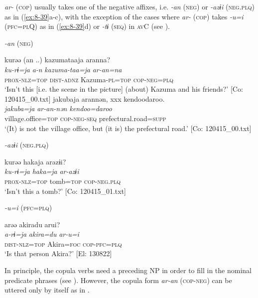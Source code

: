 \textit{ar-} (\textsc{cop}) usually takes one of the negative affixes, i.e. \textit{-an} (\textsc{neg}) or \textit{-azɨi} (\textsc{neg}.\textsc{plq}) as in (\ref{ex:8-39}a-c), with the exception of the cases where \textit{ar-} (\textsc{cop}) takes \textit{-u=i} (\textsc{pfc}=\textsc{pl}Q) as in (\ref{ex:8-39}d) or \textit{-tɨ} (\textsc{seq}) in \textsc{av}C (see ).

\ea\label{ex:8-39}
  \textit{-an} (\textsc{neg})

\ea
{\TM}
\glll  kurəə  (an ..)  kazumataaja  aranna?\\
\textit{ku-rɨ=ja}  \textit{a-n}  \textit{kazuma-taa=ja}  \textit{ar-an=na}\\
\textsc{prox}-\textsc{nlz}=\textsc{top}  \textsc{dist}-\textsc{adnz}  Kazuma-\textsc{pl}=\textsc{top}  \textsc{cop}-\textsc{neg}=\textsc{plq}\\
\glt ‘Isn’t this [i.e. the scene in the picture] (about) Kazuma and his friends?’ [Co: 120415\_00.txt]
\ex
{\TM}
\glll  jakubaja  arannən,  xxx  {\textbar}kendoo{\textbar}daroo.\\
\textit{jakuba=ja}  \textit{ar-an-nən    kendoo=daroo}\\
village.office=\textsc{top}  \textsc{cop}-\textsc{neg}-\textsc{seq}    prefectural.road=\textsc{supp}\\
\glt ‘(It) is not the village office, but (it is) the prefectural road.’ [Co: 120415\_00.txt]

  \textit{-azɨi} (\textsc{neg}.\textsc{plq})

\ex
{\TM}
\glll  kurəə  hakaja  arazɨi?\\
\textit{ku-rɨ=ja}  \textit{haka=ja}  \textit{ar-azɨi}\\
\textsc{prox}-\textsc{nlz}=\textsc{top}  tomb=\textsc{top}  \textsc{cop}-\textsc{neg}.\textsc{plq}\\
\glt ‘Isn’t this a tomb?’ [Co: 120415\_01.txt]

  \textit{-u=i} (\textsc{pfc}=\textsc{plq})

\ex
{\TM}
\glll  arəə  akiradu  arui?\\
\textit{a-rɨ=ja}  \textit{akira=du}  \textit{ar-u=i}\\
\textsc{dist}-\textsc{nlz}=\textsc{top}  Akira=\textsc{foc}  \textsc{cop}-\textsc{pfc}=\textsc{plq}\\
\glt ‘Is that person Akira?’ [El: 130822]
\z
\z

  In principle, the copula verbs need a preceding NP in order to fill in the nominal predicate phrases (see ). However, the copula form \textit{ar-an} (\textsc{cop}-\textsc{neg}) can be uttered only by itself as in .

